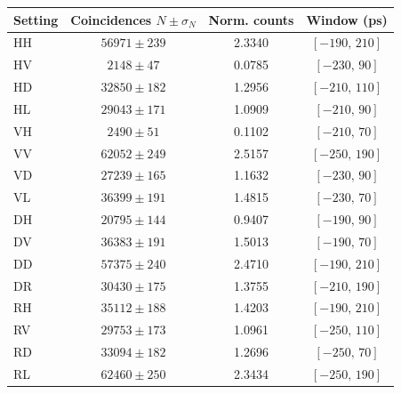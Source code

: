 \begin{tabular}{lccc}
\hline
Setting & Coincidences $N\pm\sigma_N$ & Norm. counts & Window (ps) \\
\hline
HH & $56971\pm239$ & 2.3340 & $[-190,\,210]$ \\
HV & $2148\pm47$ & 0.0785 & $[-230,\,90]$ \\
HD & $32850\pm182$ & 1.2956 & $[-210,\,110]$ \\
HL & $29043\pm171$ & 1.0909 & $[-210,\,90]$ \\
VH & $2490\pm51$ & 0.1102 & $[-210,\,70]$ \\
VV & $62052\pm249$ & 2.5157 & $[-250,\,190]$ \\
VD & $27239\pm165$ & 1.1632 & $[-230,\,90]$ \\
VL & $36399\pm191$ & 1.4815 & $[-230,\,70]$ \\
DH & $20795\pm144$ & 0.9407 & $[-190,\,90]$ \\
DV & $36383\pm191$ & 1.5013 & $[-190,\,70]$ \\
DD & $57375\pm240$ & 2.4710 & $[-190,\,210]$ \\
DR & $30430\pm175$ & 1.3755 & $[-210,\,190]$ \\
RH & $35112\pm188$ & 1.4203 & $[-190,\,210]$ \\
RV & $29753\pm173$ & 1.0961 & $[-250,\,110]$ \\
RD & $33094\pm182$ & 1.2696 & $[-250,\,70]$ \\
RL & $62460\pm250$ & 2.3434 & $[-250,\,190]$ \\
\hline
\end{tabular}